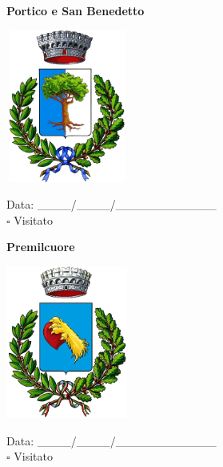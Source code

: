 \documentclass[a5paper,12pt]{article}
\begin{document}
\newpage

\noindent
\begin{minipage}[t]{0.45\textwidth}
    \begin{center}
        \textbf{Portico e San Benedetto}
    \end{center}
    \vspace{-0.5cm} %
    \begin{center}
        \includegraphics[height= 5cm, width=4cm]{Emilia Romagna/Stemma Portico e San Benedetto.png}
    \end{center}
    \vspace{-0.4cm} %
    \begin{flushleft}
        Data: \_\_\_\_/\_\_\_\_/\_\_\_\_\_\_\_\_\_\_\_\_ \\
        $\square$ Visitato
    \end{flushleft}
\end{minipage}
\hfill
\noindent
\begin{minipage}[t]{0.45\textwidth}
    \begin{center}
        \textbf{Premilcuore}
    \end{center}
    \vspace{-0.5cm} %
    \begin{center}
        \includegraphics[height= 5cm, width=4cm]{Emilia Romagna/Stemma Premilcuore.png}
    \end{center}
    \vspace{-0.4cm} %
    \begin{flushleft}
        Data: \_\_\_\_/\_\_\_\_/\_\_\_\_\_\_\_\_\_\_\_\_ \\
        $\square$ Visitato
    \end{flushleft}
\end{minipage}
\end{document}
